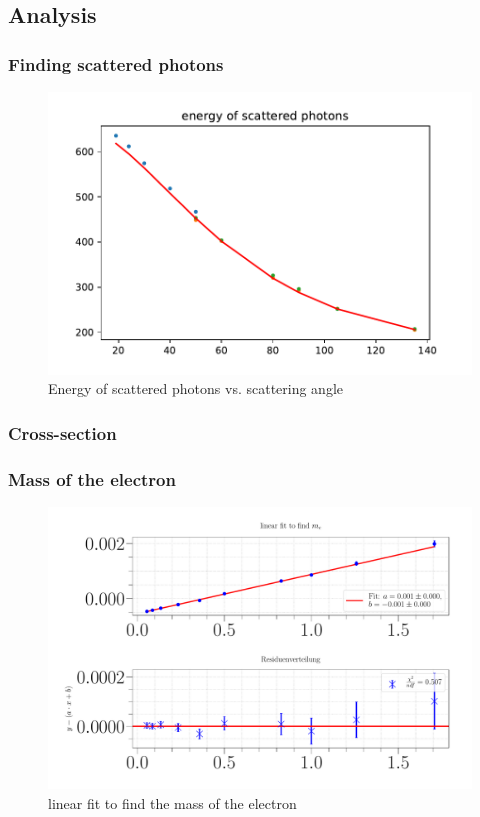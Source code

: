 \documentclass[a4paper,12pt]{article}
\begin{document}
\subsection{Analysis}

\subsubsection{Finding scattered photons}

\begin{figure}
\center
\includegraphics[scale=0.3]{../Figures/E_Phi.pdf}
\caption{Energy of scattered photons vs. scattering angle}
\label{resolution}
\end{figure}
\newpage

\subsubsection{Cross-section}

\subsubsection{Mass of the electron}

\begin{figure}
\center
\includegraphics[scale=0.3]{../Figures/linearfittofindme.pdf}
\caption{linear fit to find the mass of the electron}
\label{meFit}
\end{figure}
\newpage
\end{document}
